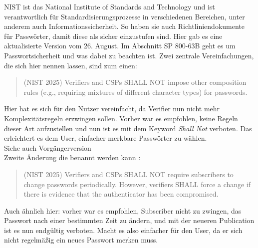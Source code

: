 NIST ist das National Institute of Standards and Technology und ist verantwortlich für Standardisierungsprozesse in verschiedenen Bereichen, unter anderem auch Informationssicherheit. So haben sie auch Richtliniendokumente für Passwörter, damit diese als sicher einzustufen sind. Hier gab es eine aktualisierte Version vom 26. August.\cite{nist_sp800_63_4_2025} Im Abschnitt SP 800-63B geht es um Passwortsicherheit und was dabei zu beachten ist. Zwei zentrale Vereinfachungen, die sich hier nennen lassen, sind zum einen:\\
\begin{quote}
(NIST 2025) Verifiers and CSPs SHALL NOT impose other composition rules (e.g., requiring mixtures of different character types) for passwords. 
\end{quote}
Hier hat es sich für den Nutzer vereinfacht, da Verifier nun nicht mehr Komplexitätsregeln erzwingen sollen. Vorher war es empfohlen, keine Regeln dieser Art aufzustellen und nun ist es mit dem Keyword \textit{Shall Not} verboten. Das erleichtert es dem User, einfacher merkbare Passwörter zu wählen.\\ 
Siehe auch Vorgängerversion \cite{nist_800_63_3_2017}\\
Zweite Änderung die benannt werden kann :
\begin{quote}
(NIST 2025) Verifiers and CSPs SHALL NOT require subscribers to change passwords periodically. However, verifiers SHALL force a change if there is evidence that the authenticator has been compromised.
\end{quote}
Auch ähnlich hier: vorher war es empfohlen, Subscriber nicht zu zwingen, das Passwort nach einer bestimmten Zeit zu ändern, und mit der neueren Publication ist es nun endgültig verboten. Macht es also einfacher für den User, da er sich nicht regelmäßig ein neues Passwort merken muss.

